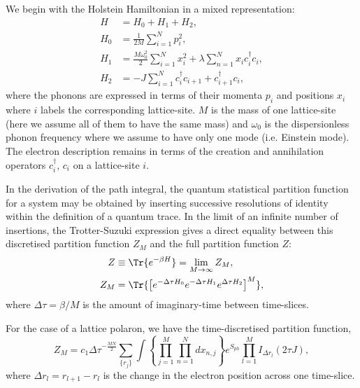 We begin with the Holstein Hamiltonian in a mixed representation:
\begin{equation}
    \begin{aligned}
        H &= H_{0} + H_{1} + H_{2} , \\
        H_{0} &= \frac{1}{2M} \sum_{i=1}^N p_i^2 , \\
        H_{1} &= \frac{M \omega_0^2}{2} \sum_{i=1}^N x_i^2 + \lambda \sum_{n=1}^N x_i c^\dagger_i c_i , \\
        H_{2} &= -J \sum_{i=1}^N c^\dagger_i c_{i+1} + c_{i+1}^\dagger c_i ,
    \end{aligned}
\end{equation}
 where the phonons are expressed in terms of their momenta $p_i$ and positions $x_i$ where $i$ labels the corresponding lattice-site. $M$ is the mass of one lattice-site (here we assume all of them to have the same mass) and $\omega_0$ is the dispersionless phonon frequency where we assume to have only one mode (i.e. Einstein mode). The electron description remains in terms of the creation and annihilation operators $c^\dagger_i$, $c_i$ on a lattice-site $i$.
\newline

In the derivation of the path integral, the quantum statistical partition function for a system may be obtained by inserting successive resolutions of identity within the definition of a quantum trace. In the limit of an infinite number of insertions, the Trotter-Suzuki expression \cite{Trotter1959, Hatano2005} gives a direct equality between this discretised partition function $Z_M$ and the full partition function $Z$:
\begin{equation}
    \begin{aligned}
        Z &\equiv \Tr{e^{-\beta H}} = \lim_{M\to\infty} Z_M , \\
        Z_M &= \Tr{\left[ e^{-\Delta\tau H_0} e^{-\Delta\tau H_1} e^{\Delta\tau H_2} \right]^M} ,
    \end{aligned}
\end{equation}
where $\Delta\tau = \beta / M$ is the amount of imaginary-time between time-slices.
\newline

For the case of a lattice polaron, we have the time-discretised partition function,
\begin{equation}
    Z_M = c_1 {\Delta\tau}^{-\frac{MN}{2}} \sum_{\{r_j\}} \int \left\{ \prod_{j=1}^M \prod_{n=1}^N dx_{n,j} \right\} e^{S_{ph}} \prod_{l=1}^M I_{\Delta r_l}(2 \tau J) ,
\end{equation}
where $\Delta r_l = r_{l+1} - r_l$ is the change in the electron position across one time-slice.
\newline


